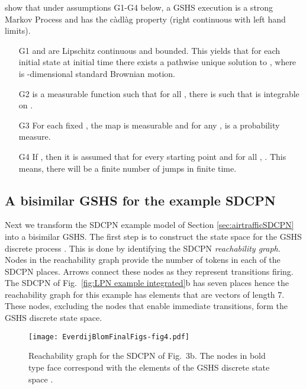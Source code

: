 \documentclass[copyright,creativecommons]{eptcs}
\begin{document}
\cite{BujorianuLygeros2006} show that under assumptions G1-G4 below,
a GSHS execution is a strong Markov Process and has the c{\`a}dl{\`a}g property
(right continuous with left hand limits).
\begin{itemize}
\item[G1]  and  are Lipschitz continuous and bounded.
      This yields that for each initial state  at initial time 
      there exists a pathwise unique solution  to
      , where
       is -dimensional standard Brownian motion.

\item[G2] 
      is a measurable function such that for all , there is  such that
       is integrable on .

\item[G3] For each fixed , the map  is measurable and
      for any ,  is a probability measure.

\item[G4] If , then it is assumed that for every starting point  and
      for all , . This means, there will be a finite
      number of jumps in finite time.
\end{itemize}

\subsection{A bisimilar GSHS for the example SDCPN}\label{sec:sdcpnexample}
Next we transform the SDCPN example model of Section \ref{sec:airtrafficSDCPN}
into a bisimilar GSHS. The first step is to construct the state space
 for the GSHS discrete process . This is
done by identifying the  SDCPN {\em reachability graph}. Nodes in
the reachability graph provide the number of tokens in each of the
SDCPN places. Arrows connect these nodes as they represent
transitions firing. The SDCPN of Fig.\ \ref{fig:LPN example
integrated}b has seven places hence the reachability graph for this
example has elements that are vectors of length 7. These nodes,
excluding the nodes that enable immediate transitions, form the
GSHS discrete state space.


\begin{figure}[h!bt]
\begin{center}
\texttt{[image: EverdijBlomFinalFigs-fig4.pdf]}
\end{center}
\caption{Reachability graph for the SDCPN of Fig.\ 3b.
The nodes in bold type face correspond with
the elements of the GSHS discrete state space .}
\label{fig:RGexample}
\end{figure}
\end{document}
